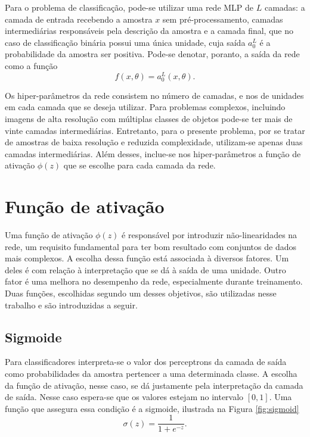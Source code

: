 Para o problema de classificação, pode-se utilizar uma rede MLP de $L$ camadas: a camada de entrada recebendo a amostra $x$ sem pré-processamento, camadas intermediárias responsáveis pela descrição da amostra e a camada final, que no caso de classificação binária possui uma única unidade, cuja saída $a^L_0$ é a probabilidade da amostra ser positiva. Pode-se denotar, poranto, a saída da rede como a função
\begin{equation}
f(x, \theta) = a^L_0(x, \theta).
\end{equation}

Os hiper-parâmetros da rede consistem no número de camadas, e nos de unidades em cada camada que se deseja utilizar. Para problemas complexos, incluindo imagens de alta resolução com múltiplas classes de objetos pode-se ter mais de vinte camadas intermediárias. Entretanto, para o presente problema, por se tratar de amostras de baixa resolução e reduzida complexidade, utilizam-se apenas duas camadas intermediárias. Além desses, inclue-se nos hiper-parâmetros a função de ativação $\phi(z)$ que se escolhe para cada camada da rede.

\section{Função de ativação}
\label{sec:funcao-ativacao}
Uma função de ativação $\phi(z)$ é responsável por introduzir não-linearidades na rede, um requisito fundamental para ter bom resultado com conjuntos de dados mais complexos. A escolha dessa função está associada à diversos fatores. Um deles é com relação à interpretação que se dá à saída de uma unidade. Outro fator é uma melhora no desempenho da rede, especialmente durante treinamento. Duas funções, escolhidas segundo um desses objetivos, são utilizadas nesse trabalho e são introduzidas a seguir.

\subsection{Sigmoide}
Para classificadores interpreta-se o valor dos perceptrons da camada de saída como probabilidades da amostra pertencer a uma determinada classe. A escolha da função de ativação, nesse caso, se dá justamente pela interpretação da camada de saída. Nesse caso espera-se que os valores estejam no intervalo $[0,1]$. Uma função que assegura essa condição é a sigmoide, ilustrada na Figura \ref{fig:sigmoid}
\begin{equation}
	\label{eq:sigm}
	\sigma(z) = \frac{1}{1+e^{-z}}.
\end{equation}


